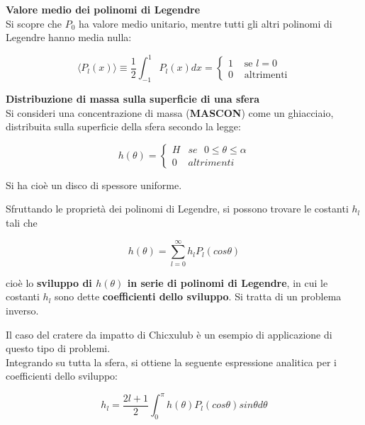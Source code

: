 \documentclass[a4paper,12pt]{book}
\begin{document}
\noindent
\textbf{Valore medio dei polinomi di Legendre}\\

\noindent
Si scopre che $P_0$ ha valore medio unitario, mentre tutti gli altri polinomi di Legendre hanno media nulla:

\begin{equation}
    \langle P_l (x) \rangle \equiv \frac{1}{2} \int _{-1} ^1 P_l (x) dx = \begin{cases}
        1 & \text{ se } l = 0 \\ 0 & \text{ altrimenti}
    \end{cases}
\end{equation}

\noindent
\textcolor{colore4}{\textbf{Distribuzione di massa sulla superficie di una sfera}}\\

\noindent
Si consideri una concentrazione di massa (\textbf{MASCON}) come un ghiacciaio, distribuita sulla superficie della sfera secondo la legge:

\begin{equation}
    h(\theta) = \begin{cases}
        H & se \text{ } 0 \le \theta \le \alpha \\ 0 & altrimenti
    \end{cases}
\end{equation}

\noindent
Si ha cioè un disco di spessore uniforme.

\noindent
Sfruttando le proprietà dei polinomi di Legendre, si possono trovare le costanti $h_l$ tali che

\begin{equation}
    h(\theta) = \sum_{l=0}^\infty h_l P_l (cos \theta)
\end{equation}

\noindent
cioè lo \textbf{sviluppo di $h(\theta)$ in serie di polinomi di Legendre}, in cui le costanti $h_l$ sono dette \textbf{coefficienti dello sviluppo}.
Si tratta di un problema inverso.

\noindent
Il caso del cratere da impatto di Chicxulub è un esempio di applicazione di questo tipo di problemi.\\

\noindent
Integrando su tutta la sfera, si ottiene la seguente espressione analitica per i coefficienti dello sviluppo:

\begin{equation}
    h_l = \frac{2l + 1}{2} \int _0^\pi h(\theta) P_l (cos \theta) sin \theta d \theta
\end{equation}
\end{document}
